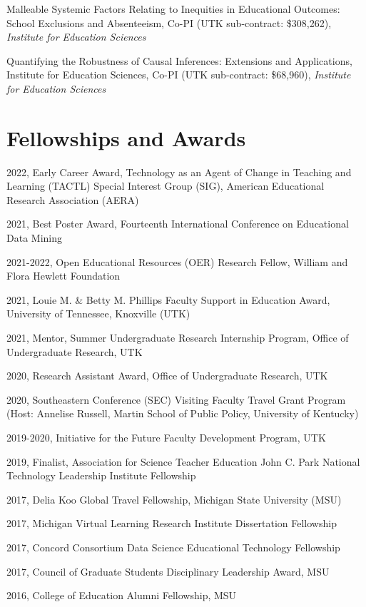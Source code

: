 \documentclass[
  14,
]{article}
\begin{document}
Malleable Systemic Factors Relating to Inequities in Educational
Outcomes: School Exclusions and Absenteeism, Co-PI (UTK sub-contract:
\$308,262), \emph{Institute for Education Sciences}

Quantifying the Robustness of Causal Inferences: Extensions and
Applications, Institute for Education Sciences, Co-PI (UTK sub-contract:
\$68,960), \emph{Institute for Education Sciences}

\hypertarget{fellowships-and-awards}{%
\section{Fellowships and Awards}\label{fellowships-and-awards}}

2022, Early Career Award, Technology as an Agent of Change in Teaching
and Learning (TACTL) Special Interest Group (SIG), American Educational
Research Association (AERA)

2021, Best Poster Award, Fourteenth International Conference on
Educational Data Mining

2021-2022, Open Educational Resources (OER) Research Fellow, William and
Flora Hewlett Foundation

2021, Louie M. \& Betty M. Phillips Faculty Support in Education Award,
University of Tennessee, Knoxville (UTK)

2021, Mentor, Summer Undergraduate Research Internship Program, Office
of Undergraduate Research, UTK

2020, Research Assistant Award, Office of Undergraduate Research, UTK

2020, Southeastern Conference (SEC) Visiting Faculty Travel Grant
Program (Host: Annelise Russell, Martin School of Public Policy,
University of Kentucky)

2019-2020, Initiative for the Future Faculty Development Program, UTK

2019, Finalist, Association for Science Teacher Education John C. Park
National Technology Leadership Institute Fellowship

2017, Delia Koo Global Travel Fellowship, Michigan State University
(MSU)

2017, Michigan Virtual Learning Research Institute Dissertation
Fellowship

2017, Concord Consortium Data Science Educational Technology Fellowship

2017, Council of Graduate Students Disciplinary Leadership Award, MSU

2016, College of Education Alumni Fellowship, MSU
\end{document}
